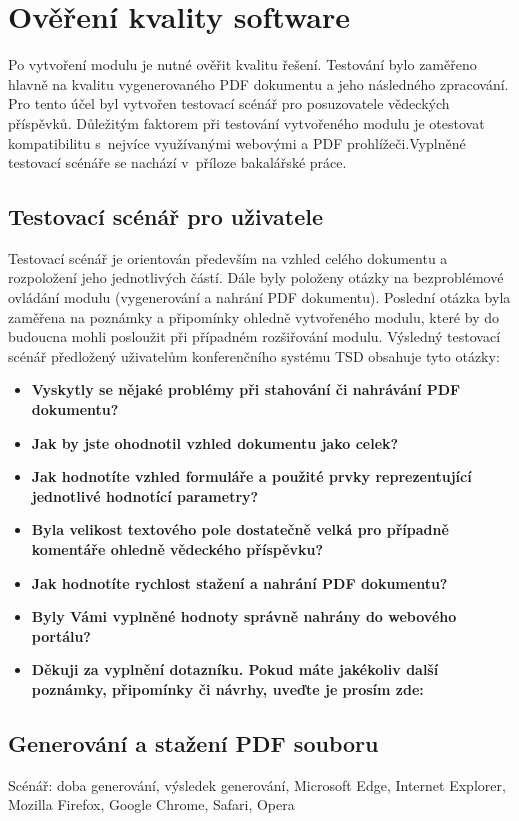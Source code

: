 \chapter{Ověření kvality software}
Po vytvoření modulu je nutné ověřit kvalitu řešení. Testování bylo zaměřeno hlavně na kvalitu vygenerovaného PDF dokumentu a jeho následného zpracování. Pro tento účel byl vytvořen testovací scénář pro posuzovatele vědeckých příspěvků. Důležitým faktorem při testování vytvořeného modulu je otestovat kompatibilitu s~nejvíce využívanými webovými a PDF prohlížeči.Vyplněné testovací scénáře se nachází v~příloze bakalářské práce.

\section{Testovací scénář pro uživatele}
Testovací scénář je orientován především na vzhled celého dokumentu a rozpoložení jeho jednotlivých částí. Dále byly položeny otázky na bezproblémové ovládání modulu (vygenerování a nahrání PDF dokumentu). Poslední otázka byla zaměřena na poznámky a připomínky ohledně vytvořeného modulu, které by do budoucna mohli posloužit při případném rozšiřování modulu.
Výsledný testovací scénář předložený uživatelům konferenčního systému TSD obsahuje tyto otázky:
\begin{itemize}
	\item \textbf{Vyskytly se nějaké problémy při stahování či nahrávání PDF dokumentu?}
	\item \textbf{Jak by jste ohodnotil vzhled dokumentu jako celek?}
	\item \textbf{Jak hodnotíte vzhled formuláře a použité prvky reprezentující jednotlivé hodnotící parametry?}
	\item \textbf{Byla velikost textového pole dostatečně velká pro případně komentáře ohledně vědeckého příspěvku?}
	\item \textbf{Jak hodnotíte rychlost stažení a nahrání PDF dokumentu?} 
	\item \textbf{Byly Vámi vyplněné hodnoty správně nahrány do webového portálu?}
	\item \textbf{Děkuji za vyplnění dotazníku. Pokud máte jakékoliv další poznámky, připomínky či návrhy, uveďte je prosím zde:}
\end{itemize}

\section{Generování a stažení PDF souboru}
Scénář: doba generování, výsledek generování, Microsoft Edge, Internet Explorer, Mozilla Firefox, Google Chrome, Safari, Opera

